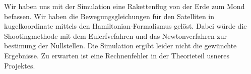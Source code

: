 \documentclass{subfiles}
\begin{document}
    Wir haben uns mit der Simulation eine Rakettenflug von der Erde zum Mond befassen. Wir haben die Bewegungsgleichungen für den Satelliten in kugelkoordinate 
    mittels den Hamiltonian-Formalismus gelöst. Dabei würde die Shootingmethode mit dem Eulerfvefahren und das Newtonverfahren zur bestimung der Nullstellen.
    Die Simulation ergibt leider nicht die gewünchte Ergebnisse. Zu erwarten ist eine Rechnenfehler in der Theorieteil usneres Projektes.
\end{document}
